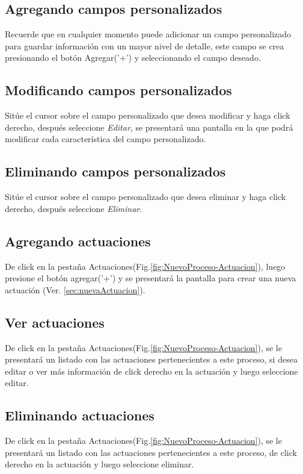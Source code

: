 \subsection{Agregando campos personalizados}
\label{sec:agregarCamposProceso}
Recuerde que en cualquier momento puede adicionar un campo personalizado para guardar informaci\'on con un mayor nivel de detalle, este campo se crea presionando el bot\'on Agregar('+') y seleccionando el campo deseado.

\subsection{Modificando campos personalizados}
\label{sec:modificarCamposProceso}
Sit\'ue el cursor sobre el campo personalizado que desea modificar y haga click derecho, despu\'es seleccione \emph{Editar},
se presentar\'a una pantalla en la que podr\'a modificar cada caracter\'istica
del campo personalizado.

\subsection{Eliminando campos personalizados}
\label{sec:eliminarCamposProceso}
Sit\'ue el cursor sobre el campo personalizado que desea eliminar y haga click derecho, despu\'es seleccione \emph{Eliminar}.

\subsection{Agregando actuaciones}
\label{sec:agregarActuacionesProceso}
De click en la pesta\~na Actuaciones(Fig.\ref{fig:NuevoProceso-Actuacion}), luego presione el bot\'on agregar('+') y se presentar\'a la pantalla para crear una nueva actuaci\'on (Ver.
\ref{sec:nuevaActuacion}).
  


\subsection{Ver actuaciones}
\label{sec:verActuacionesProceso}
De click en la pesta\~na Actuaciones(Fig.\ref{fig:NuevoProceso-Actuacion}), se le
presentar\'a un listado con las actuaciones pertenecientes a este proceso,
si desea editar o ver m\'as informaci\'on de click derecho en la actuaci\'on y luego seleccione editar.

\subsection{Eliminando actuaciones}
\label{sec:eliminarActuacionesProceso}
De click en la pesta\~na Actuaciones(Fig.\ref{fig:NuevoProceso-Actuacion}), se le
presentar\'a un listado con las actuaciones pertenecientes a este proceso,
de click derecho en la actuaci\'on y luego seleccione eliminar.

